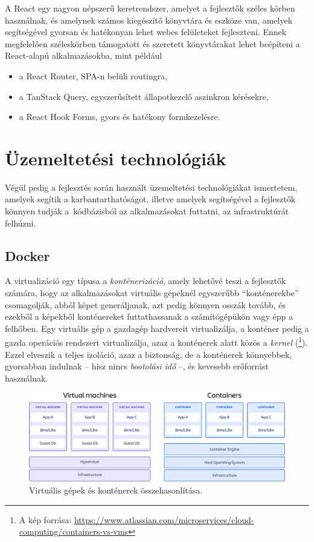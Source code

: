 A React egy nagyon népszerű keretrendszer, amelyet a fejlesztők széles körben használnak, és amelynek számos kiegészítő könyvtára és eszköze van, amelyek segítségével gyorsan és hatékonyan lehet webes felületeket fejleszteni. Ennek megfelelően széleskörben támogatott és szeretett könyvtárakat lehet beépíteni a React-alapú alkalmazásokba, mint például

\begin{itemize}
	\setlength{\itemsep}{1pt}
  \setlength{\parskip}{0pt}
  \setlength{\parsep}{0pt}
	\item a React Router, SPA-n belüli routingra,
	\item a TanStack Query, egyszerűsített állapotkezelő aszinkron kérésekre,
	\item a React Hook Forms, gyors és hatékony formkezelésre.
\end{itemize}

\section{Üzemeltetési technológiák}

Végül pedig a fejlesztés során használt üzemeltetési technológiákat ismertetem, amelyek segítik a karbantarthatóságot, illetve amelyek segítségével a fejlesztők könnyen tudják a~kódbázisból az alkalmazásokat futtatni, az infrastruktúrát felhúzni.

\subsection{Docker}

A virtualizáció egy típusa a \emph{konténerizáció}, amely lehetővé teszi a fejlesztők számára, hogy az alkalmazásokat virtuális gépeknél egyszerűbb ``konténerekbe'' csomagolják, abból képet generáljanak, azt pedig könnyen osszák tovább, és ezekből a képekből konténereket futtathassanak a számítógépükön vagy épp a felhőben. Egy virtuális gép a gazdagép hardvereit virtualizálja, a konténer pedig a gazda operációs rendszert virtualizálja, azaz a konténerek alatt közös a \emph{kernel} (\footnote{A kép forrása: \url{https://www.atlassian.com/microservices/cloud-computing/containers-vs-vms}}). Ezzel elveszik a teljes izoláció, azaz a biztonság, de a konténerek könnyebbek, gyorsabban indulnak -- hisz nincs \emph{bootolási idő} --, és kevesebb erőforrást használnak. 

\begin{figure}[h]
	\centering
	\includegraphics[width=120mm, keepaspectratio]{figures/virtudocker.png}
	\caption{Virtuális gépek és konténerek összehasonlítása.}
	\label{fig:virtudocker}
\end{figure}

